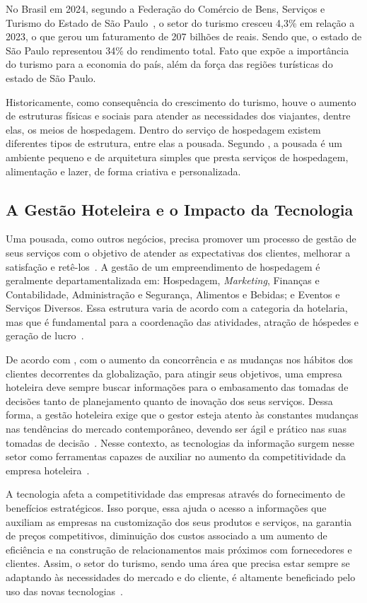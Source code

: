 \documentclass[
	12pt,				%
	openany,			%
	oneside,			%
	a4paper,			%
	english,			%
	french,				%
	spanish,			%
	brazil				%
	]{abntex2}
\begin{document}
No Brasil em 2024, segundo a Federação do Comércio de Bens, Serviços e Turismo do Estado de São Paulo~\cite{fecomercio2024}, o setor do turismo cresceu 4,3\% em relação a 2023, o que gerou um faturamento de 207 bilhões de reais. Sendo que, o estado de São Paulo representou 34\% do rendimento total. Fato que expõe a importância do turismo para a economia  do país, além da força das regiões turísticas do estado de São Paulo. 

Historicamente, como consequência do crescimento do turismo, houve o aumento de estruturas físicas e sociais para atender as necessidades dos viajantes, dentre elas, os meios de hospedagem. Dentro do serviço de hospedagem existem diferentes tipos de estrutura, entre elas a pousada. Segundo , a pousada é um ambiente pequeno e de arquitetura simples que presta serviços de hospedagem, alimentação e lazer, de forma criativa e personalizada. 

\subsection{A Gestão Hoteleira e o Impacto da Tecnologia}
Uma pousada, como outros negócios, precisa promover um processo de gestão de seus serviços com o objetivo de atender as expectativas dos clientes, melhorar a satisfação e retê-los~\cite{zanella2006}. A gestão de um empreendimento de hospedagem é geralmente departamentalizada em: Hospedagem, \textit{Marketing}, Finanças e Contabilidade, Administração e Segurança, Alimentos e Bebidas; e Eventos e Serviços Diversos. Essa estrutura varia de acordo com a categoria da hotelaria, mas que é fundamental para a coordenação das atividades, atração de hóspedes e geração de lucro~\cite{martins2011}.

De acordo com , com o aumento da concorrência e as mudanças nos hábitos dos clientes decorrentes da globalização, para atingir seus objetivos, uma empresa hoteleira deve sempre buscar informações para o embasamento das tomadas de decisões tanto de planejamento quanto de inovação dos seus serviços. Dessa forma,  a gestão hoteleira exige que o gestor esteja atento às constantes mudanças nas tendências do mercado contemporâneo, devendo ser ágil e prático nas suas tomadas de decisão~\cite{mauricio2011}. Nesse contexto, as tecnologias da informação surgem nesse setor como ferramentas capazes de auxiliar no aumento da competitividade da empresa hoteleira~\cite{buhalis1998}. 

A tecnologia afeta a competitividade das empresas através do fornecimento de benefícios estratégicos. Isso porque, essa ajuda o acesso a informações que auxiliam as empresas na customização dos seus produtos e serviços,  na garantia de preços competitivos, diminuição dos custos associado a um aumento de eficiência e na construção de relacionamentos mais próximos com fornecedores e clientes. Assim, o setor do turismo, sendo uma área que precisa estar sempre se adaptando às necessidades do mercado e do cliente, é altamente beneficiado pelo uso das novas tecnologias~\cite{buhalis1998}.
\end{document}
